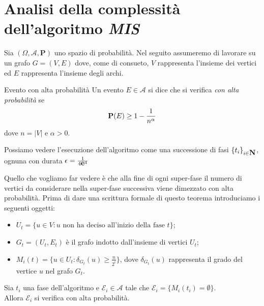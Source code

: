 \documentclass{article}
\begin{document}
\maketitle

\section{Analisi della complessit\`a dell'algoritmo \emph{MIS}}
Sia $(\Omega, \mathcal{A}, \mathbf{P})$ uno spazio di probabilit\`a.
Nel seguito assumeremo di lavorare su un grafo $G = (V, E)$ dove, come
di consueto, $V$ rappresenta l'insieme dei vertici ed $E$ rappresenta 
l'insieme degli archi.

\begin{defn}{Evento con alta probabilit\`a}
Un evento $E \in \mathcal{A}$ si dice che si verifica \emph{
con alta probabilit\`a} se 
\begin{displaymath}
    \mathbf{P}(E) \geq 1 - {{1} \over {n^\alpha}} 
\end{displaymath}
dove $n = |V|$ e $\alpha > 0$.
\end{defn}

Possiamo vedere l'esecuzione dell'algoritmo come una successione di fasi
$\lbrace t_i \rbrace_{i \in \mbox{{\bfseries N}}}$, ognuna con durata $\epsilon = 
{{1} \over {4\mbox{{\bfseries e}}^{4}}}$

Quello che vogliamo far vedere \`e che alla fine di ogni super-fase il 
numero di vertici da considerare nella super-fase successiva viene 
dimezzato con alta probabilit\`a. Prima di dare una scrittura formale di questo 
teorema introduciamo i seguenti oggetti:
\begin{itemize}
    \item $U_t = \lbrace u \in V : u \text{ non ha deciso all'inizio della
        fase } t \rbrace$;
    \item $G_t = (U_t, E_t)$ \`e il grafo indotto dall'insieme di vertici $U_t$;
    \item $M_i(t) = \lbrace u \in U_t : \delta_{G_t}(u) \geq 
        \frac{n}{2^i} \rbrace$, dove $\delta_{G_t}(u)$ rappresenta il grado
        del vertice $u$ nel grafo $G_t$.
\end{itemize}

\begin{lemma}
    \label{lemma:epsilon-i}
    Sia $t_i$ una fase dell'algoritmo e $\mathcal{E}_i \in \mathcal{A}$ 
    tale che $\mathcal{E}_i = \lbrace M_i(t_i) = \emptyset\rbrace$. \\
    Allora $\mathcal{E}_i$ si verifica con alta probabilit\`a.
\end{lemma}
\end{document}
